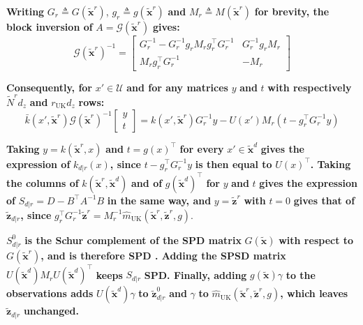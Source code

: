 \documentclass[preprint]{elsarticle}
\begin{document}
\textbf{Writing} $G_r\triangleq G(\tilde{\mathbf{x}}^r)$, $g_r\triangleq g(\tilde{\mathbf{x}}^r)$ \textbf{and} $M_r\triangleq M(\tilde{\mathbf{x}}^r)$ \textbf{for brevity, the block inversion of} $A=\mathcal{G}(\tilde{\mathbf{x}}^r)$ \textbf{gives:}
\begin{equation*}
    \mathcal{G}(\tilde{\mathbf{x}}^r)^{-1}=\begin{bmatrix}G_r^{-1}-G_r^{-1}g_rM_rg_r^\top G_r^{-1}&G_r^{-1}g_rM_r\\M_rg_r^\top G_r^{-1}&-M_r\end{bmatrix}
\end{equation*}

\textbf{Consequently, for} $x'\in\mathcal{U}$ \textbf{and for any matrices} $y$ \textbf{and} $t$ \textbf{with respectively} $\tilde{N}^rd_z$ \textbf{and} $r_{\mathrm{UK}}d_z$ \textbf{rows:}
\begin{equation*}
    \bar{k}(x',\tilde{\mathbf{x}}^r)\mathcal{G}(\tilde{\mathbf{x}}^r)^{-1}\begin{bmatrix}y\\t\end{bmatrix}=k(x',\tilde{\mathbf{x}}^r)G_r^{-1}y-U(x')M_r\left(t-g_r^\top G_r^{-1}y\right)
\end{equation*}

\textbf{Taking} $y=k(\tilde{\mathbf{x}}^r,x)$ \textbf{and} $t=g(x)^\top$ \textbf{for every} $x'\in\tilde{\mathbf{x}}^d$ \textbf{gives the expression of} $k_{d|r}(x)$\textbf{, since} $t-g_r^\top G_r^{-1}y$ \textbf{is then equal to} $U(x)^\top$\textbf{. Taking the columns of} $k(\tilde{\mathbf{x}}^r,\tilde{\mathbf{x}}^d)$ \textbf{and of} $g(\tilde{\mathbf{x}}^d)^\top$ \textbf{for} $y$ \textbf{and} $t$ \textbf{gives the expression of} $S_{d|r}=D-B^\top A^{-1}B$ \textbf{in the same way, and} $y=\tilde{\mathbf{z}}^r$ \textbf{with} $t=0$ \textbf{gives that of} $\tilde{\mathbf{z}}_{d|r}$\textbf{, since} $g_r^\top G_r^{-1}\tilde{\mathbf{z}}^r=M_r^{-1}\hat{m}_{\mathrm{UK}}(\tilde{\mathbf{x}}^r,\tilde{\mathbf{z}}^r,g)$.

$S^0_{d|r}$ \textbf{is the Schur complement of the SPD matrix} $G(\tilde{\mathbf{x}})$ \textbf{with respect to} $G(\tilde{\mathbf{x}}^r)$\textbf{, and is therefore SPD \cite{bib:matrix-analysis}. Adding the SPSD matrix} $U(\tilde{\mathbf{x}}^d)M_rU(\tilde{\mathbf{x}}^d)^\top$ \textbf{keeps} $S_{d|r}$ \textbf{SPD. Finally, adding} $g(\tilde{\mathbf{x}})\gamma$ \textbf{to the observations adds} $U(\tilde{\mathbf{x}}^d)\gamma$ \textbf{to} $\tilde{\mathbf{z}}^0_{d|r}$ \textbf{and} $\gamma$ \textbf{to} $\hat{m}_{\mathrm{UK}}(\tilde{\mathbf{x}}^r,\tilde{\mathbf{z}}^r,g)$\textbf{, which leaves} $\tilde{\mathbf{z}}_{d|r}$ \textbf{unchanged.}
\end{document}
